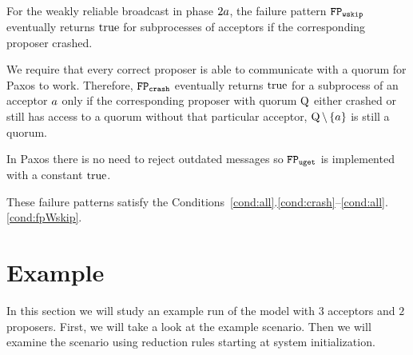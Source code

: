 For the weakly reliable broadcast in phase $2a$, the failure pattern $\mathtt{FP_{wskip}}$ eventually returns $\operatorname{true}$ for subprocesses of acceptors if the corresponding proposer crashed.

We require that every correct proposer is able to communicate with a quorum for Paxos to work.
Therefore, $\mathtt{FP_{crash}}$ eventually returns $\operatorname{true}$ for a subprocess of an acceptor $a$ only if the corresponding proposer with quorum $\operatorname{Q}$ either crashed or still has access to a quorum without that particular acceptor, \ie $\operatorname{Q}\setminus\left\{a\right\}$ is still a quorum.

In Paxos there is no need to reject outdated messages so $\mathtt{FP_{uget}}$ is implemented with a constant $\operatorname{true}$.

These failure patterns satisfy the Conditions~\ref{cond:all}.\ref{cond:crash}--\ref{cond:all}.\ref{cond:fpWskip}.

\section{Example}
In this section we will study an example run of the model with $3$ acceptors and $2$ proposers.
First, we will take a look at the example scenario.
Then we will examine the scenario using reduction rules starting at system initialization.


